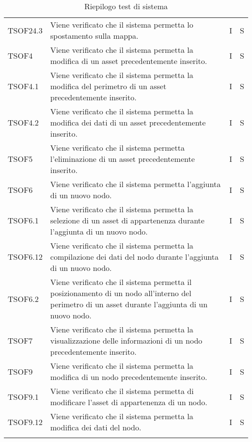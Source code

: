 \begin{longtable}{p{1.5cm}!{\VRule[1pt]}p{5cm}!{\VRule[1pt]}p{1cm}!{\VRule[1pt]}p{1cm}}
			TSOF24.3 & Viene verificato che il sistema permetta lo spostamento sulla mappa. & I & S \\ 
			TSOF4 & Viene verificato che il sistema permetta la modifica di un asset precedentemente inserito. & I & S \\ 
			TSOF4.1 & Viene verificato che il sistema permetta la modifica del perimetro di un asset precedentemente inserito. & I & S \\ 
			TSOF4.2 & Viene verificato che il sistema permetta la modifica dei dati di un asset precedentemente inserito. & I & S \\ 
			TSOF5 & Viene verificato che il sistema permetta l'eliminazione di un asset precedentemente inserito. & I & S \\ 
			TSOF6 & Viene verificato che il sistema permetta l'aggiunta di un nuovo nodo. & I & S \\ 
			TSOF6.1 & Viene verificato che il sistema permetta la selezione di un asset di appartenenza durante l'aggiunta di un nuovo nodo. & I & S \\ 
			TSOF6.12 & Viene verificato che il sistema permetta la compilazione dei dati del nodo durante l'aggiunta di un nuovo nodo. & I & S \\ 
			TSOF6.2 & Viene verificato che il sistema permetta il posizionamento di un nodo all'interno del perimetro di un asset durante l'aggiunta di un nuovo nodo. & I & S \\ 
			TSOF7 & Viene verificato che il sistema permetta la visualizzazione delle informazioni di un nodo precedentemente inserito. & I & S \\ 
			TSOF9 & Viene verificato che il sistema permetta la modifica di un nodo precedentemente inserito. & I & S \\ 
			TSOF9.1 & Viene verificato che il sistema permetta di modificare l'asset di appartenenza di un nodo. & I & S \\ 
			TSOF9.12 & Viene verificato che il sistema permetta la modifica dei dati del nodo. & I & S \\ 
			\caption{Riepilogo test di sistema}
		\end{longtable}
		
